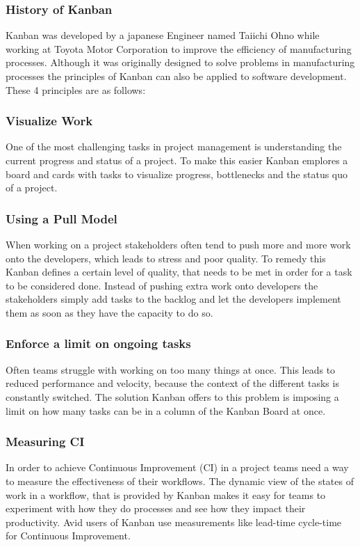 \subsubsection{History of Kanban}
Kanban was developed by a japanese Engineer named Taiichi Ohno while working at Toyota Motor Corporation to improve the efficiency of manufacturing processes. Although it was originally
designed to solve problems in manufacturing processes the principles of Kanban can also be applied to software development. These 4 principles are as follows:

\subsubsection{Visualize Work}
One of the most challenging tasks in project management is understanding the current progress and status of a project. To make this easier Kanban emplores a board and cards with tasks to
visualize progress, bottlenecks and the status quo of a project.

\subsubsection{Using a Pull Model}
When working on a project stakeholders often tend to push more and more work onto the developers, which leads to stress and poor quality. To remedy this Kanban defines a certain level of
quality, that needs to be met in order for a task to be considered done. Instead of pushing extra work onto developers the stakeholders simply add tasks to the backlog and let the 
developers implement them as soon as they have the capacity to do so.

\subsubsection{Enforce a limit on ongoing tasks}
Often teams struggle with working on too many things at once. This leads to reduced performance and velocity, because the context of the different tasks is constantly switched. 
The solution Kanban offers to this problem is imposing a limit on how many tasks can be in a column of the Kanban Board at once. 

\subsubsection{Measuring CI}
In order to achieve Continuous Improvement (CI) in a project teams need a way to measure the effectiveness of their workflows. The dynamic view of the states of work in a workflow, that is 
provided by Kanban makes it easy for teams to experiment with how they do processes and see how they impact their productivity. Avid users of Kanban use measurements like lead-time 
cycle-time \cite{cycle-time-lead-time} for Continuous Improvement.  

